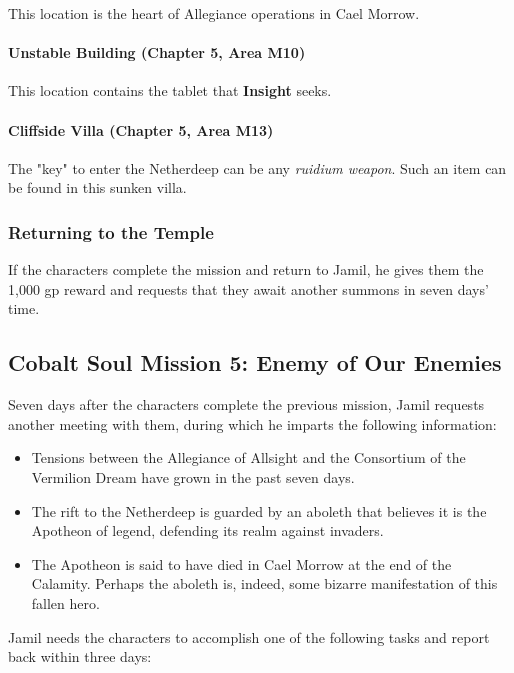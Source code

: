 \documentclass[a4paper, 11pt, bg=full, twocolumn, nooutline]{dndbook}
\begin{document}
This location is the heart of Allegiance operations in Cael Morrow.

\paragraph{Unstable Building (Chapter 5, Area M10)}

This location contains the tablet that \textbf{Insight} seeks.

\paragraph{Cliffside Villa (Chapter 5, Area M13)}

The "key" to enter the Netherdeep can be any \textit{ruidium weapon}. Such an item can be found in this sunken villa.

\subsubsection{Returning to the Temple}

If the characters complete the mission and return to Jamil, he gives them the 1,000 gp reward and requests that they await another summons in seven days' time.

\subsection{Cobalt Soul Mission 5: Enemy of Our Enemies}

Seven days after the characters complete the previous mission, Jamil requests another meeting with them, during which he imparts the following information:

\begin{itemize}
\item Tensions between the Allegiance of Allsight and the Consortium of the Vermilion Dream have grown in the past seven days.
\item The rift to the Netherdeep is guarded by an aboleth that believes it is the Apotheon of legend, defending its realm against invaders.
\item The Apotheon is said to have died in Cael Morrow at the end of the Calamity. Perhaps the aboleth is, indeed, some bizarre manifestation of this fallen hero.
\end{itemize}

Jamil needs the characters to accomplish one of the following tasks and report back within three days:
\end{document}
